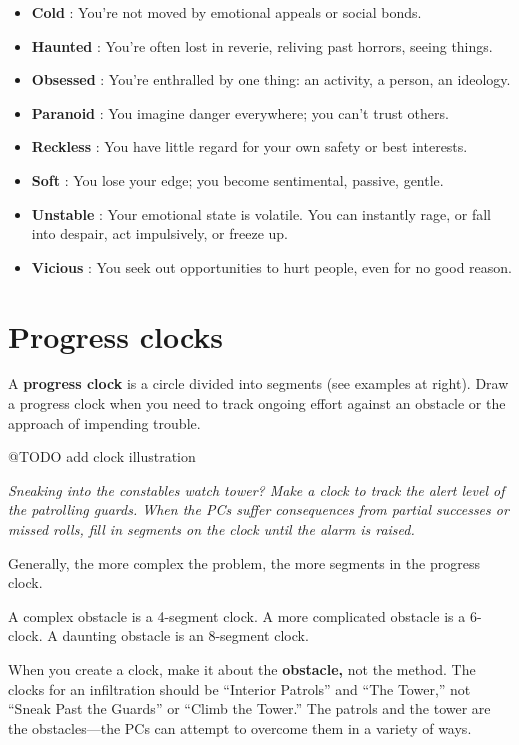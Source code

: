 \documentclass[11pt,oneside]{book}
\newcommand{\gameterm}[1]{\textbf{#1}}
\begin{document}
\begin{itemize}
	\item \gameterm{Cold} : You’re not moved by emotional appeals or social bonds.
	\item \gameterm{Haunted} : You’re often lost in reverie, reliving past horrors, seeing things.
	\item \gameterm{Obsessed} : You’re enthralled by one thing: an activity, a person, an ideology.
	\item \gameterm{Paranoid} : You imagine danger everywhere; you can’t trust others.
	\item \gameterm{Reckless} : You have little regard for your own safety or best interests.
	\item \gameterm{Soft} : You lose your edge; you become sentimental, passive, gentle.
	\item \gameterm{Unstable} : Your emotional state is volatile. You can instantly rage, or fall into despair, act impulsively, or freeze up.
	\item \gameterm{Vicious} : You seek out opportunities to hurt people, even for no good reason.
\end{itemize}

\chapter{Progress clocks}

A \textbf{progress clock} is a circle divided into segments (see examples at right). Draw a progress clock when you need to track ongoing effort against an obstacle or the approach of impending trouble.

@TODO add clock illustration

\emph{Sneaking into the constables watch tower? Make a clock to track the alert level of the patrolling guards. When the PCs suffer consequences from partial successes or missed rolls, fill in segments on the clock until the alarm is raised.}

Generally, the more complex the problem, the more segments in the progress clock.

A complex obstacle is a 4-segment clock. A more complicated obstacle is a 6-clock. A daunting obstacle is an 8-segment clock.

When you create a clock, make it about the \textbf{obstacle,} not the method. The clocks for an infiltration should be “Interior Patrols” and “The Tower,” not “Sneak Past the Guards” or “Climb the Tower.” The patrols and the tower are the obstacles---the PCs can attempt to overcome them in a variety of ways.
\end{document}
